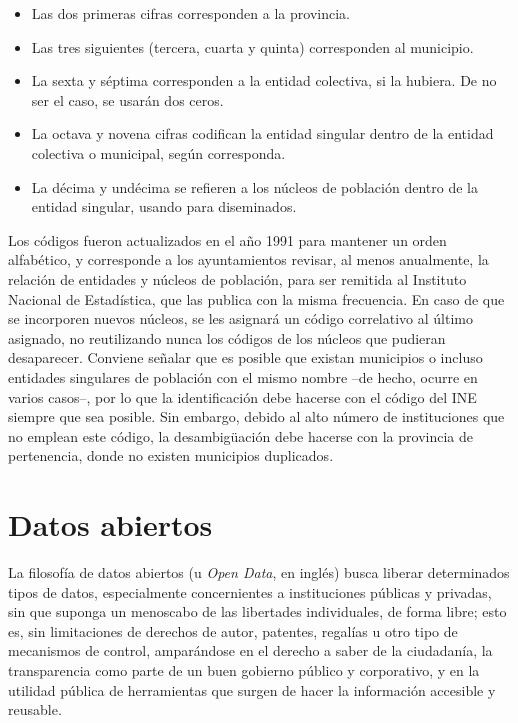 \begin{itemize}
    \item Las dos primeras cifras corresponden a la provincia.
    \item Las tres siguientes (tercera, cuarta y quinta) corresponden al municipio.
    \item La sexta y séptima corresponden a la entidad colectiva, si la hubiera. De no ser el caso, se usarán dos ceros.
    \item La octava y novena cifras codifican la entidad singular dentro de la entidad colectiva o municipal, según corresponda.
    \item La décima y undécima se refieren a los núcleos de población dentro de la entidad singular, usando \guillemotright\space para diseminados.
\end{itemize}

Los códigos fueron actualizados en el año 1991 para mantener un orden alfabético, y corresponde a los ayuntamientos revisar, al menos anualmente, la relación de entidades y núcleos de población, para ser remitida al Instituto Nacional de Estadística, que las publica con la misma frecuencia. En caso de que se incorporen nuevos núcleos, se les asignará un código correlativo al último asignado, no reutilizando nunca los códigos de los núcleos que pudieran desaparecer. Conviene señalar que es posible que existan municipios o incluso entidades singulares de población con el mismo nombre –de hecho, ocurre en varios casos–, por lo que la identificación debe hacerse con el código del INE siempre que sea posible. Sin embargo, debido al alto número de instituciones que no emplean este código, la desambigüación debe hacerse con la provincia de pertenencia, donde no existen municipios duplicados.

\section{Datos abiertos}

La filosofía de datos abiertos (u \textit{Open Data}, en inglés) busca liberar determinados tipos de datos, especialmente concernientes a instituciones públicas y privadas, sin que suponga un menoscabo de las libertades individuales, de forma libre; esto es, sin limitaciones de derechos de autor, patentes, regalías u otro tipo de mecanismos de control, amparándose en el derecho a saber de la ciudadanía, la transparencia como parte de un buen gobierno público y corporativo, y en la utilidad pública de herramientas que surgen de hacer la información accesible y reusable.~\cite{datos_abiertos}

